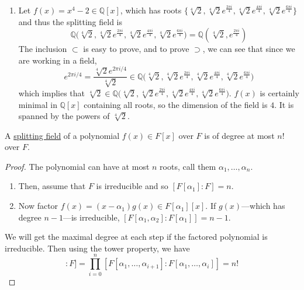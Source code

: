\begin{example}
\begin{enumerate}
      \item Let $f(x) = x^4 - 2 \in \mathbb{Q}[x]$, which has roots $\{ \sqrt[4]{2}, \sqrt[4]{2} e^{\frac{2\pi i}{4}}, \sqrt[4]{2} e^{\frac{4\pi i}{4}}, \sqrt[4]{2} e^{\frac{6\pi i}{4}} \}$ and thus the splitting field is 
      \begin{equation}
        \mathbb{Q} \big( \sqrt[4]{2}, \sqrt[4]{2} e^{\frac{2\pi i}{4}}, \sqrt[4]{2} e^{\frac{4\pi i}{4}}, \sqrt[4]{2} e^{\frac{6\pi i}{4}} \big) = \mathbb{Q}(\sqrt[4]{2}, e^{\frac{2\pi i}{4}})
      \end{equation}
      The inclusion $\subset$ is easy to prove, and to prove $\supset$, we can see that since we are working in a field, 
      \begin{equation}
        e^{2 \pi i / 4} = \frac{\sqrt[4]{2} e^{2\pi i/4}}{\sqrt[4]{2}} \in \mathbb{Q} \big( \sqrt[4]{2}, \sqrt[4]{2} e^{\frac{2\pi i}{4}}, \sqrt[4]{2} e^{\frac{4\pi i}{4}}, \sqrt[4]{2} e^{\frac{6\pi i}{4}} \big) 
      \end{equation}
      which implies that $\sqrt[4]{2} \in \mathbb{Q} \big( \sqrt[4]{2}, \sqrt[4]{2} e^{\frac{2\pi i}{4}}, \sqrt[4]{2} e^{\frac{4\pi i}{4}}, \sqrt[4]{2} e^{\frac{6\pi i}{4}} \big)$. $f(x)$ is certainly minimal in $\mathbb{Q}[x]$ containing all roots, so the dimension of the field is $4$. It is spanned by the powers of $\sqrt[4]{2}$. 
    \end{enumerate}
  \end{example}

  \begin{theorem}
    \label{thm:bounds-on-degree-of-splitting-field}
    A \hyperref[def:splitting-field]{splitting field} of a polynomial $f(x) \in F[x]$ over $F$ is of degree at most $n!$ over $F$. 
  \end{theorem}
  \begin{proof}
    The polynomial can have at most $n$ roots, call them $\alpha_1, \ldots, \alpha_n$. 
    \begin{enumerate}
      \item Then, assume that $F$ is irreducible and so $[F[\alpha_1]: F] = n$. 
      \item Now factor $f(x) = (x - \alpha_1) g(x) \in F[\alpha_1][x]$. If $g(x)$---which has degree $n-1$---is irreducible, $[F[\alpha_1, \alpha_2]:F[\alpha_1]] = n-1$. 
    \end{enumerate}
    We will get the maximal degree at each step if the factored polynomial is irreducible. Then using the tower property, we have 
    \begin{equation}
      [F[\alpha_1, \ldots, \alpha_n]:F] = \prod_{i=0}^n [F[\alpha_1, \ldots, \alpha_{i+1}]: F[\alpha_1, \ldots, \alpha_i]] = n!
    \end{equation}
  \end{proof}

